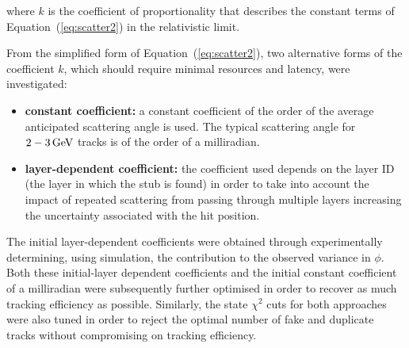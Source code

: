 where $k$ is the coefficient of proportionality that describes the constant terms of Equation~(\ref{eq:scatter2}) in the relativistic limit.

From the simplified form of Equation~(\ref{eq:scatter2}), two alternative forms of the coefficient $k$, which should require minimal resources and latency, were investigated:

\begin{itemize}
\item \textbf{constant coefficient:} a constant coefficient of the order of the average anticipated scattering angle is used. The typical scattering angle for $2-3\,\text{Ge\hspace{-.08em}V}$ tracks is of the order of a milliradian.
\item \textbf{layer-dependent coefficient:} the coefficient used depends on the layer ID (\ie the layer in which the stub is found) in order to take into account the impact of repeated scattering from passing through multiple layers increasing the uncertainty associated with the hit position.
\end{itemize}

The initial layer-dependent coefficients were obtained through experimentally determining, using simulation, the \MS contribution to the observed variance in $\phi$.
Both these initial-layer dependent coefficients and the initial constant coefficient of a milliradian were subsequently further optimised in order to recover as much tracking efficiency as  possible.
Similarly, the \KF state $\chi^{2}$ cuts for both approaches were also tuned in order to reject the optimal number of fake and duplicate tracks without compromising on tracking efficiency.

